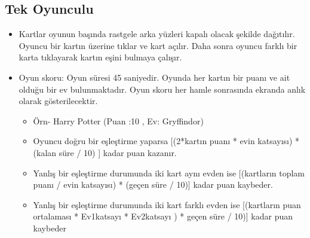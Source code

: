 \documentclass[conference]{IEEEtran}
\begin{document}
\subsection{Tek Oyunculu}
\begin{itemize}
    \item Kartlar oyunun başında rastgele arka yüzleri kapalı olacak şekilde dağıtılır. Oyuncu bir kartın üzerine tıklar ve kart açılır. Daha sonra oyuncu farklı bir karta tıklayarak kartın eşini bulmaya çalışır.
    \item Oyun skoru: Oyun süresi 45 saniyedir. Oyunda her kartın bir puanı ve ait olduğu bir ev bulunmaktadır. Oyun skoru her hamle sonrasında ekranda anlık olarak gösterilecektir.
    \begin{itemize}
        \item Örn- Harry Potter (Puan :10 , Ev: Gryffindor)
        \item Oyuncu doğru bir eşleştirme yaparsa [(2*kartın puanı * evin katsayısı) * (kalan süre / 10) ] kadar puan kazanır.
        \item Yanlış bir eşleştirme durumunda iki kart aynı evden ise [(kartların toplam puanı / evin katsayısı) * (geçen süre / 10)] kadar puan kaybeder.
        \item Yanlış bir eşleştirme durumunda iki kart farklı evden ise [(kartların puan ortalaması * Ev1katsayı * Ev2katsayı ) * geçen süre / 10)] kadar puan kaybeder
    \end{itemize}
\end{itemize}
\end{document}
